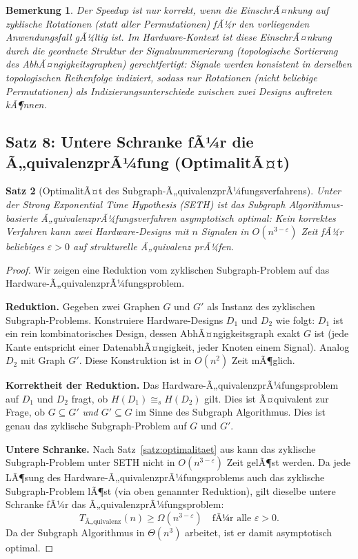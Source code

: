 ﻿\documentclass[12pt,a4paper]{report}
\newtheorem{theorem}{Satz}[section]
\newtheorem{bemerkung}[theorem]{Bemerkung}
\begin{document}
\begin{bemerkung}
Der Speedup ist nur korrekt, wenn die EinschrÃ¤nkung auf zyklische Rotationen (statt aller Permutationen) fÃ¼r den vorliegenden Anwendungsfall gÃ¼ltig ist. Im Hardware-Kontext ist diese EinschrÃ¤nkung durch die geordnete Struktur der Signalnummerierung (topologische Sortierung des AbhÃ¤ngigkeitsgraphen) gerechtfertigt: Signale werden konsistent in derselben topologischen Reihenfolge indiziert, sodass nur Rotationen (nicht beliebige Permutationen) als Indizierungsunterschiede zwischen zwei Designs auftreten kÃ¶nnen.
\end{bemerkung}

\subsection{Satz 8: Untere Schranke fÃ¼r die Ã„quivalenzprÃ¼fung (OptimalitÃ¤t)}

\begin{theorem}[OptimalitÃ¤t des Subgraph-Ã„quivalenzprÃ¼fungsverfahrens]
\label{thm:optimalitaet_aequivalenz}
Unter der Strong Exponential Time Hypothesis (SETH) ist das Subgraph Algorithmus-basierte Ã„quivalenz\-prÃ¼fungsverfahren asymptotisch \emph{optimal}: Kein korrektes Verfahren kann zwei Hardware-Designs mit $n$ Signalen in $O(n^{3-\varepsilon})$ Zeit fÃ¼r beliebiges $\varepsilon > 0$ auf strukturelle Ã„quivalenz prÃ¼fen.
\end{theorem}

\begin{proof}
Wir zeigen eine Reduktion vom zyklischen Subgraph-Problem auf das Hardware-Ã„quivalenzprÃ¼fungsproblem.

\textbf{Reduktion.} Gegeben zwei Graphen $G$ und $G'$ als Instanz des zyklischen Subgraph-Problems. Konstruiere Hardware-Designs $D_1$ und $D_2$ wie folgt: $D_1$ ist ein rein kombinatorisches Design, dessen AbhÃ¤ngigkeitsgraph exakt $G$ ist (jede Kante entspricht einer DatenabhÃ¤ngigkeit, jeder Knoten einem Signal). Analog $D_2$ mit Graph $G'$. Diese Konstruktion ist in $O(n^2)$ Zeit mÃ¶glich.

\textbf{Korrektheit der Reduktion.} Das Hardware-Ã„quivalenzprÃ¼fungsproblem auf $D_1$ und $D_2$ fragt, ob $H(D_1) \cong_s H(D_2)$ gilt. Dies ist Ã¤quivalent zur Frage, ob $G \subseteq G'$ \emph{und} $G' \subseteq G$ im Sinne des Subgraph Algorithmus. Dies ist genau das zyklische Subgraph-Problem auf $G$ und $G'$.

\textbf{Untere Schranke.} Nach Satz~\ref{satz:optimalitaet} aus \cite{subgraph2026} kann das zyklische Subgraph-Problem unter SETH nicht in $O(n^{3-\varepsilon})$ Zeit gelÃ¶st werden. Da jede LÃ¶sung des Hardware-Ã„quivalenzprÃ¼\-fungsproblems auch das zyklische Subgraph-Problem lÃ¶st (via oben genannter Reduktion), gilt dieselbe untere Schranke fÃ¼r das Ã„quivalenzprÃ¼fungsproblem:
\[
T_{\text{Ã„quivalenz}}(n) \geq \Omega(n^{3-\varepsilon}) \quad \text{fÃ¼r alle } \varepsilon > 0.
\]
Da der Subgraph Algorithmus in $\Theta(n^3)$ arbeitet, ist er damit asymptotisch optimal.
\end{proof}
\end{document}
